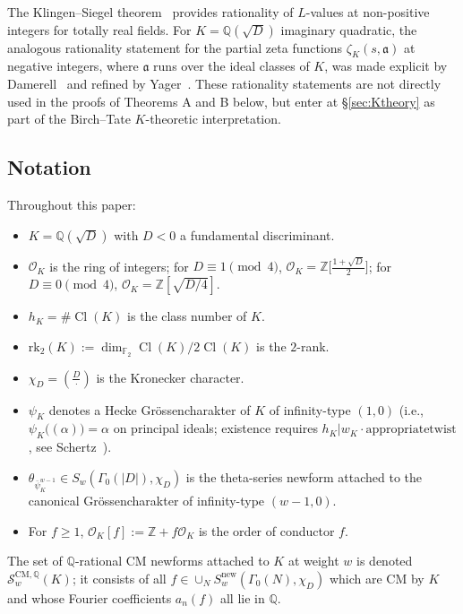 \documentclass[11pt,a4paper]{amsart}
\theoremstyle{definition}
\DeclareMathOperator{\Cl}{Cl}
\newcommand{\Q}{\mathbb{Q}}
\newcommand{\Z}{\mathbb{Z}}
\newcommand{\F}{\mathbb{F}}
\newcommand{\OK}{\mathcal{O}_K}
\newcommand{\fa}{\mathfrak{a}}
\newcommand{\Scal}{\mathcal{S}}
\newcommand{\hK}{h_{K}}
\begin{document}
The Klingen--Siegel theorem~\cite{Siegel1969, Klingen1962} provides rationality of $L$-values at non-positive integers for totally real fields. For $K = \Q(\sqrt{D})$ imaginary quadratic, the analogous rationality statement for the partial zeta functions $\zeta_K(s, \fa)$ at negative integers, where $\fa$ runs over the ideal classes of $K$, was made explicit by Damerell~\cite{Damerell1970} and refined by Yager~\cite{Yager1982}. These rationality statements are not directly used in the proofs of Theorems A and B below, but enter at \S\ref{sec:Ktheory} as part of the Birch--Tate $K$-theoretic interpretation.

\subsection{Notation}\label{sec:notation}

Throughout this paper:
\begin{itemize}[leftmargin=2em]
  \item $K = \Q(\sqrt{D})$ with $D < 0$ a fundamental discriminant.
  \item $\OK$ is the ring of integers; for $D \equiv 1 \pmod 4$, $\OK = \Z\bigl[\tfrac{1 + \sqrt{D}}{2}\bigr]$; for $D \equiv 0 \pmod 4$, $\OK = \Z[\sqrt{D/4}]$.
  \item $\hK = \#\Cl(K)$ is the class number of $K$.
  \item $\mathrm{rk}_2(K) := \dim_{\F_2} \Cl(K)/2\Cl(K)$ is the $2$-rank.
  \item $\chi_D = \left(\frac{D}{\cdot}\right)$ is the Kronecker character.
  \item $\psi_K$ denotes a Hecke Gr\"ossencharakter of $K$ of infinity-type $(1, 0)$ (i.e., $\psi_K\big((\alpha)\big) = \alpha$ on principal ideals; existence requires $\hK | w_K \cdot \mathrm{appropriate twist}$, see Schertz~\cite[\S4.10]{Schertz2010}).
  \item $\theta_{\bar\psi_K^{w-1}} \in S_w(\Gamma_0(|D|), \chi_D)$ is the theta-series newform attached to the canonical Gr\"ossencharakter of infinity-type $(w-1, 0)$.
  \item For $f \ge 1$, $\OK[f] := \Z + f \OK$ is the order of conductor $f$.
\end{itemize}

The set of $\Q$-rational CM newforms attached to $K$ at weight $w$ is denoted $\Scal_w^{\mathrm{CM}, \Q}(K)$; it consists of all $f \in \cup_N S_w^{\mathrm{new}}(\Gamma_0(N), \chi_D)$ which are CM by $K$ and whose Fourier coefficients $a_n(f)$ all lie in $\Q$.
\end{document}
